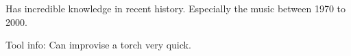 \begin{npcBox}[title=Lost: Falko]
    \begin{stressSection}
    \end{stressSection}
    \begin{tabularx}{\textwidth}{ XX }
    \end{tabularx}

    \begin{consequences}
    \item {}
    \item {}
    \item {}
    \end{consequences}

    \begin{npcDescription}

    Has incredible knowledge in recent history. Especially the music between 1970 to 2000.

    Tool info: Can improvise a torch very quick.

    \end{npcDescription}

\end{npcBox}





